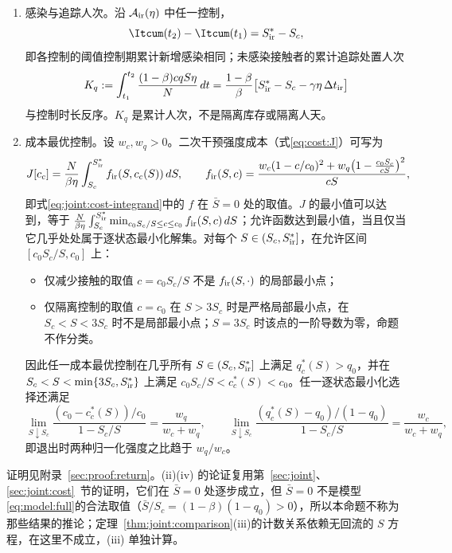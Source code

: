 \begin{proposition}
\begin{enumerate}
\item 感染与追踪人次。沿 $\mathcal A_{\rm ir}(\eta)$ 中任一控制，
\begin{equation}
\Itcum(t_2)-\Itcum(t_1)=S^*_{\rm ir}-S_c,
\label{eq:return:cumulative}
\end{equation}
即各控制的阈值控制期累计新增感染相同；未感染接触者的累计追踪处置人次
\begin{equation}
K_q:=\int_{t_1}^{t_2}\frac{(1-\beta)cqS\eta}{N}\,dt
=\frac{1-\beta}{\beta}\bigl[S^*_{\rm ir}-S_c-\gamma\eta\,\Delta t_{\rm ir}\bigr]
\label{eq:return:Kq}
\end{equation}
与控制时长反序。$K_q$ 是累计人次，不是隔离库存或隔离人天。
\item 成本最优控制。设 $w_c,w_q>0$。二次干预强度成本（式\eqref{eq:cost:J}）可写为
\begin{equation}
J[c_c]=\frac{N}{\beta\eta}\int_{S_c}^{S^*_{\rm ir}}f_{\rm ir}(S,c_c(S))\,dS,\qquad
f_{\rm ir}(S,c)=\frac{w_c(1-c/c_0)^2+w_q\bigl(1-\frac{c_0S_c}{cS}\bigr)^2}{cS},
\label{eq:return:cost}
\end{equation}
即式\eqref{eq:joint:cost-integrand}中的 $f$ 在 $\bar S=0$ 处的取值。$J$ 的最小值可以达到，等于 $\frac{N}{\beta\eta}\int_{S_c}^{S^*_{\rm ir}}\min_{c_0S_c/S\le c\le c_0}f_{\rm ir}(S,c)\,dS$；允许函数达到最小值，当且仅当它几乎处处属于逐状态最小化解集。对每个 $S\in(S_c,S^*_{\rm ir}]$，在允许区间 $[c_0S_c/S,c_0]$ 上：
\begin{itemize}
\item[(a)] 仅减少接触的取值 $c=c_0S_c/S$ 不是 $f_{\rm ir}(S,\cdot)$ 的局部最小点；
\item[(b)] 仅隔离控制的取值 $c=c_0$ 在 $S>3S_c$ 时是严格局部最小点，在 $S_c<S<3S_c$ 时不是局部最小点；$S=3S_c$ 时该点的一阶导数为零，命题不作分类。
\end{itemize}
因此任一成本最优控制在几乎所有 $S\in(S_c,S^*_{\rm ir}]$ 上满足 $q_c^*(S)>q_0$，并在 $S_c<S<\min\{3S_c,S^*_{\rm ir}\}$ 上满足 $c_0S_c/S<c_c^*(S)<c_0$。任一逐状态最小化选择还满足
\begin{equation}
\lim_{S\downarrow S_c}\frac{(c_0-c_c^*(S))/c_0}{1-S_c/S}=\frac{w_q}{w_c+w_q},\qquad
\lim_{S\downarrow S_c}\frac{(q_c^*(S)-q_0)/(1-q_0)}{1-S_c/S}=\frac{w_c}{w_c+w_q},
\label{eq:return:ratio}
\end{equation}
即退出时两种归一化强度之比趋于 $w_q/w_c$。
\end{enumerate}
\end{proposition}
证明见附录~\ref{sec:proof:return}。(ii)(iv) 的论证复用第~\ref{sec:joint}、\ref{sec:joint:cost}~节的证明，它们在 $\bar S=0$ 处逐步成立，但 $\bar S=0$ 不是模型\eqref{eq:model:full}的合法取值（$\bar S/S_c=(1-\beta)(1-q_0)>0$），所以本命题不称为那些结果的推论；定理~\ref{thm:joint:comparison}(iii)的计数关系依赖无回流的 $S$ 方程，在这里不成立，(iii) 单独计算。

